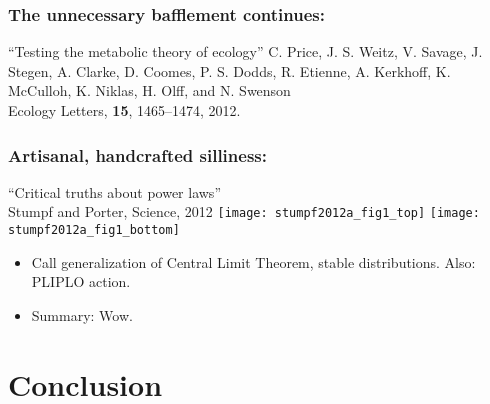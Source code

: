 \begin{frame}
  \frametitle{The unnecessary bafflement continues:}

  
  \begin{block}{``Testing the metabolic theory of ecology''\cite{price2012a}}
    C. Price, J. S. Weitz, V. Savage, J. Stegen, A. Clarke, D. Coomes, P. S. Dodds, R. Etienne, A. Kerkhoff, K. McCulloh, K. Niklas, H. Olff, and N. Swenson\\
    Ecology Letters, \textbf{15}, 1465--1474, 2012.
  \end{block}

\end{frame}

\begin{frame}
\frametitle{Artisanal, handcrafted silliness:}

\begin{block}{
  ``Critical truths about power laws''\cite{stumpf2012a}\\
  Stumpf and Porter, Science, 2012
  }
  \texttt{[image: stumpf2012a\_fig1\_top]}
  \texttt{[image: stumpf2012a\_fig1\_bottom]}
  \begin{itemize}
  \item 
    Call generalization of Central Limit Theorem,
    stable distributions.  Also: PLIPLO action.
  \item<2->
    Summary: Wow.
  \end{itemize}
\end{block}

\end{frame}


\section{Conclusion}

